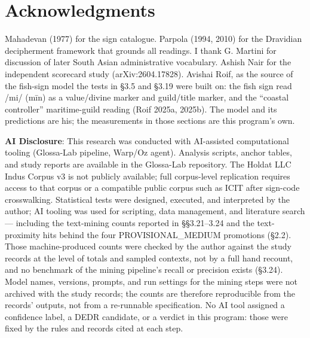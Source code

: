 \documentclass[11pt]{article}
\begin{document}
\section{Acknowledgments}\label{acknowledgments}

Mahadevan (1977) for the
sign catalogue. Parpola (1994, 2010) for the Dravidian decipherment
framework that grounds all readings. I thank G. Martini for discussion of later South Asian administrative vocabulary.
Ashish Nair for the independent scorecard study (arXiv:2604.17828).
Avishai Roif, as the source of the fish-sign model the tests in
\S3.5 and \S3.19 were built on: the fish sign read /mi/ (m\={i}n)
as a value/divine marker and guild/title marker, and the
``coastal controller'' maritime-guild reading (Roif 2025a, 2025b).
The model and its predictions are his; the measurements in those
sections are this program's own.

\textbf{AI Disclosure}: This research was conducted with AI-assisted
computational tooling (Glossa-Lab pipeline, Warp/Oz agent). Analysis scripts, anchor tables, and study reports are available in the Glossa-Lab repository. The Holdat LLC Indus Corpus v3 is not publicly available; full corpus-level replication requires access to that corpus or a compatible public corpus such as ICIT after sign-code crosswalking. Statistical tests were designed, executed, and interpreted by the author; AI tooling was used for scripting, data management, and literature search --- including the text-mining counts reported in §§3.21--3.24 and the text-proximity hits behind the four PROVISIONAL\_MEDIUM promotions (§2.2). Those machine-produced counts were checked by the author against the study records at the level of totals and sampled contexts, not by a full hand recount, and no benchmark of the mining pipeline's recall or precision exists (§3.24). Model names, versions, prompts, and run settings for the mining steps were not archived with the study records; the counts are therefore reproducible from the records' outputs, not from a re-runnable specification. No AI tool assigned a confidence label, a DEDR candidate, or a verdict in this program: those were fixed by the rules and records cited at each step.
\end{document}
